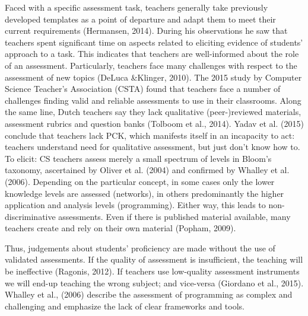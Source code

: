 Faced with a specific assessment task, teachers generally take previously developed templates as a point of departure and adapt them to meet their current requirements (Hermansen, 2014). During his observations he saw that teachers spent significant time on aspects related to eliciting evidence of students' approach to a task. This indicates that teachers are well-informed about the role of an assessment.
Particularly, teachers face many challenges with respect to the assessment of new topics (DeLuca \&Klinger, 2010). The 2015 study by Computer Science Teacher's Association (CSTA) found that teachers face a number of challenges finding valid and reliable assessments to use in their classrooms. Along the same line, Dutch teachers say they lack qualitative (peer-)reviewed materials, assessment rubrics and question banks (Tolboom et al., 2014). Yadav et al. (2015) conclude that teachers lack PCK, which manifests itself in an incapacity to act: teachers understand need for qualitative assessment, but just don't know how to. To elicit: CS teachers assess merely a small spectrum of levels in Bloom's taxonomy, ascertained by Oliver et al. (2004) and confirmed by Whalley et al. (2006). Depending on the particular concept, in some cases only the lower knowledge levels are assessed (networks), in others predominantly the higher application and analysis levels (programming). Either way, this leads to non-discriminative assessments. Even if there is published material available, many teachers create and rely on their own material (Popham, 2009).

Thus, judgements about students' proficiency are made without the use of validated assessments. If the quality of assessment is insufficient, the teaching will be ineffective (Ragonis, 2012).  If teachers use low-quality assessment instruments we will end-up teaching the wrong subject; and vice-versa (Giordano et al., 2015).  Whalley et al., (2006) describe the assessment of programming as complex and challenging and emphasize the lack of clear frameworks and tools.





